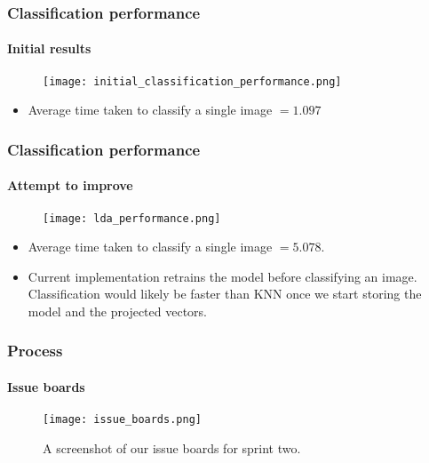 \documentclass{beamer}
\begin{document}
\begin{frame}[t]
	\frametitle{Classification performance}
	\framesubtitle{Initial results}
	\begin{figure}
		\texttt{[image: initial\_classification\_performance.png]}
	\end{figure}
	\begin{itemize}
		\item Average time taken to classify a single image $= 1.097$
	\end{itemize}
	
\end{frame}

\begin{frame}[t]
	\frametitle{Classification performance}
	\framesubtitle{Attempt to improve}
		\begin{figure}
			\texttt{[image: lda\_performance.png]}
		\end{figure}
			\begin{itemize}
				\item Average time taken to classify a single image $ = 5.078$.
				\item Current implementation retrains the model before classifying an image. Classification 
					would likely be faster than KNN once we start storing the model and the projected
					vectors.
			\end{itemize}
\end{frame}


\begin{frame}[t]
	\frametitle{Process}
	\framesubtitle{Issue boards}
	\begin{figure}
		\texttt{[image: issue\_boards.png]}
		\caption{A screenshot of our issue boards for sprint two.}
	\end{figure}
\end{frame}
\end{document}
